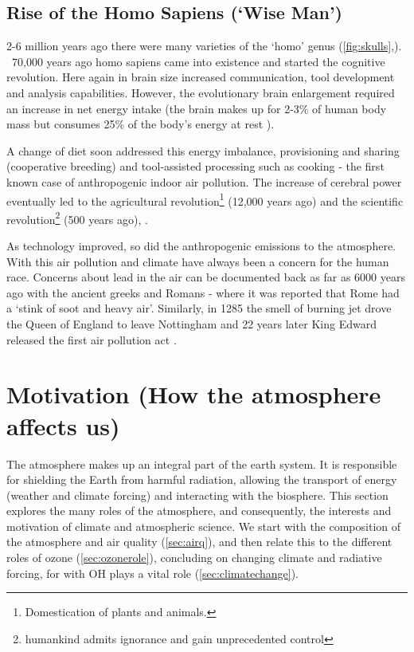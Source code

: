 \subsection{Rise of the Homo Sapiens (`Wise Man')}
2-6 million years ago there were many varieties of the `homo' genus (\autoref{fig:skulls},\cite{skull}). ~70,000 years ago homo sapiens came into existence and started the cognitive revolution. Here again in brain size increased communication, tool development and analysis capabilities. However, the evolutionary brain enlargement required an increase in net energy intake \citep{brainenergy} (the brain makes up for 2-3\% of human body mass but consumes 25\% of the body's energy at rest \citep{sapiens}).

A change of diet \citep{diet} soon addressed this energy imbalance, provisioning and sharing (cooperative breeding) and tool-assisted processing such as cooking \citep{cooking} - the first known case of anthropogenic indoor air pollution. The increase of cerebral power eventually led to the agricultural revolution\footnote{Domestication of plants and animals.} (12,000 years ago) and the scientific revolution\footnote{ humankind admits ignorance and gain unprecedented control} (500 years ago), \citep{sapiens}.

As technology improved, so did the anthropogenic emissions to the atmosphere. With this air pollution and climate have always been a concern for the human race. Concerns about lead in the air can be documented back as far as 6000 years ago with the ancient greeks \citep{skeptical} and Romans \citep{roman} - where it was reported that Rome had a `stink of soot and heavy air'. Similarly, in 1285 the smell of burning jet drove the Queen of England to leave Nottingham and 22 years later King Edward released the first air pollution act \citep{coal1}.




\section{Motivation (How the atmosphere affects us)}
The atmosphere makes up an integral part of the earth system. It is responsible for shielding the Earth from harmful radiation, allowing the transport of energy (weather and climate forcing) and interacting with the biosphere. This section explores the many roles of the atmosphere, and consequently, the interests and motivation of climate and atmospheric science. We start with the composition of the atmosphere and air quality (\autoref{sec:airq}), and then relate this to the different roles of ozone (\autoref{sec:ozonerole}), concluding on changing climate and radiative forcing, for with OH plays a vital role (\autoref{sec:climatechange}).



